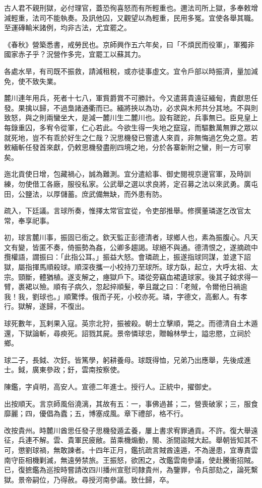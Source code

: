 \begin{pinyinscope}
古人君不親刑獄，必付理官，蓋恐徇喜怒而有所輕重也。邇法司所上獄，多奉敕增減輕重，法司不能執奏。及訊他囚，又觀望以為輕重，民用多冤。宜使各舉其職。至運磚輸米諸例，均非古法，尤宜罷之。

《春秋》營築悉書，戒勞民也。京師興作五六年矣，曰「不煩民而役軍」，軍獨非國家赤子乎？況營作多完，宜罷工以蘇其力。

各處水旱，有司既不振救，請減租稅，或亦徒事虛文。宜令戶部以時振濟，量加減免，使不致失業。

麓川連年用兵，死者十七八，軍貲爵賞不可勝計。今又遣蔣貴遠征緬甸，責獻思任發。果擒以歸，不過梟諸通衢而已。緬將挾以為功，必求與木邦共分其地。不與則致怒，與之則兩蠻坐大，是減一麓川生二麓川也。設有蹉跎，兵事無已。臣見皇上每錄重囚，多宥令從軍，仁心若此。今欲生得一失地之竄寇，而驅數萬無罪之眾以就死地，豈不有乖於好生之仁哉？況思機發已嘗遣人來貢，非無悔過乞免之意。若敕緬斬任發首來獻，仍敕思機發盡削四境之地，分於各寨新附之蠻，則一方可寧矣。

迤北貢使日增，包藏禍心，誠為難測。宜分遣給事、御史閱視京邊官軍，及時訓練，勿使借工各廠，服役私家。公武舉之選以求良將，定召募之法以來武勇。廣屯田，公鹽法，以厚儲蓄。庶武備無缺，而外患有防。

疏入，下廷議。言球所奏，惟擇太常官宜從，令吏部推舉。修撰董璘遂乞改官太常，奉享祀事。

初，球言麓川事，振固已銜之。欽天監正彭德清者，球鄉人也，素為振腹心。凡天文有變，皆匿不奏，倚振勢為姦，公卿多趨謁。球絕不與通。德清恨之，遂摘疏中攬權語，謂振曰：「此指公耳。」振益大怒。會璘疏上，振遂指球同謀，並逮下詔獄，屬指揮馬順殺球。順深夜攜一小校持刀至球所。球方臥，起立，大呼太祖、太宗。頸斷，體猶植。遂支解之，瘞獄戶下。璘從旁竊血裙遺球家。後其子鉞求得一臂，裹裙以殮。順有子病久，忽起捽順髮，拳且蹴之曰：「老賊，令爾他日禍逾我！我，劉球也。」順驚悸。俄而子死，小校亦死。璘，字德文，高郵人。有孝行。獄解，遂歸，不復出。

球死數年，瓦剌果入寇。英宗北狩，振被殺。朝士立擊順，斃之。而德清自土木遁還，下獄論斬，尋瘐死。詔戮其屍。景帝憐球忠，贈翰林學士，謚忠愍，立祠於鄉。

球二子，長鉞、次釪。皆篤學，躬耕養母。球既得恤，兄弟乃出應舉，先後成進士。鉞，廣東參政；釪，雲南按察使。

陳鑑，字貞明，高安人。宣德二年進士。授行人。正統中，擢御史。

出按順天。言京師風俗澆漓，其故有五：一，事佛過甚；二，營喪破家；三，服食靡麗；四，優倡為蠹；五，博塞成風。章下禮部，格不行。

改按貴州。時麓川酋思任發子思機發遁孟養，屢上書求宥罪通貢。不許。復大舉遠征，兵連不解。雲、貴軍民疲敝。苗乘機煽動，閩、浙間盜賊大起。舉朝皆知其不可，懲劉球禍，無敢諫者。十四年正月，鑑抗疏言賊酋遠遁，不為邊患，宜專責雲南守臣相機剿滅，無遠勞禁旅。王振怒，欲困之，改鑑雲南參議，使赴騰衝招賊。已，復摭鑑為巡按時嘗請改四川播州宣慰司隸貴州，為鑒罪，令兵部劾之，論死繫獄。景帝嗣位，乃得赦。尋授河南參議。致仕歸，卒。


\end{pinyinscope}
